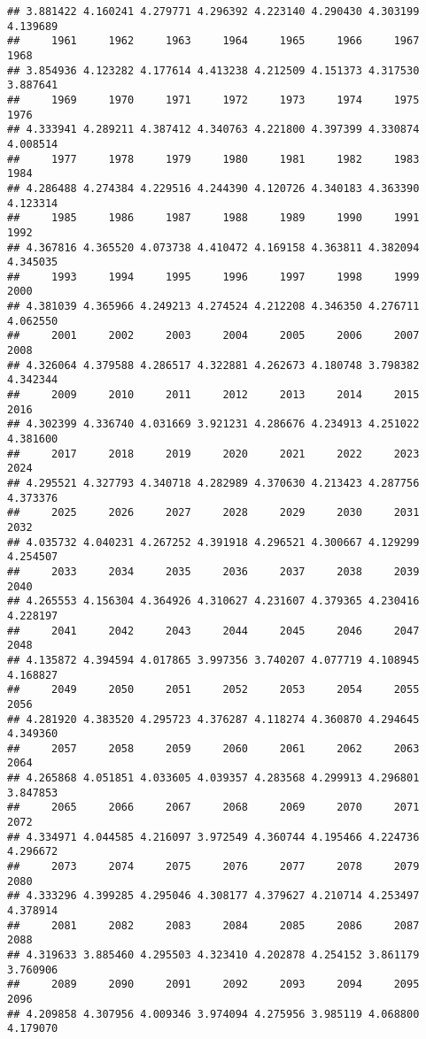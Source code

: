 \documentclass[
]{article}
\begin{document}
\begin{verbatim}
## 3.881422 4.160241 4.279771 4.296392 4.223140 4.290430 4.303199 4.139689 
##     1961     1962     1963     1964     1965     1966     1967     1968 
## 3.854936 4.123282 4.177614 4.413238 4.212509 4.151373 4.317530 3.887641 
##     1969     1970     1971     1972     1973     1974     1975     1976 
## 4.333941 4.289211 4.387412 4.340763 4.221800 4.397399 4.330874 4.008514 
##     1977     1978     1979     1980     1981     1982     1983     1984 
## 4.286488 4.274384 4.229516 4.244390 4.120726 4.340183 4.363390 4.123314 
##     1985     1986     1987     1988     1989     1990     1991     1992 
## 4.367816 4.365520 4.073738 4.410472 4.169158 4.363811 4.382094 4.345035 
##     1993     1994     1995     1996     1997     1998     1999     2000 
## 4.381039 4.365966 4.249213 4.274524 4.212208 4.346350 4.276711 4.062550 
##     2001     2002     2003     2004     2005     2006     2007     2008 
## 4.326064 4.379588 4.286517 4.322881 4.262673 4.180748 3.798382 4.342344 
##     2009     2010     2011     2012     2013     2014     2015     2016 
## 4.302399 4.336740 4.031669 3.921231 4.286676 4.234913 4.251022 4.381600 
##     2017     2018     2019     2020     2021     2022     2023     2024 
## 4.295521 4.327793 4.340718 4.282989 4.370630 4.213423 4.287756 4.373376 
##     2025     2026     2027     2028     2029     2030     2031     2032 
## 4.035732 4.040231 4.267252 4.391918 4.296521 4.300667 4.129299 4.254507 
##     2033     2034     2035     2036     2037     2038     2039     2040 
## 4.265553 4.156304 4.364926 4.310627 4.231607 4.379365 4.230416 4.228197 
##     2041     2042     2043     2044     2045     2046     2047     2048 
## 4.135872 4.394594 4.017865 3.997356 3.740207 4.077719 4.108945 4.168827 
##     2049     2050     2051     2052     2053     2054     2055     2056 
## 4.281920 4.383520 4.295723 4.376287 4.118274 4.360870 4.294645 4.349360 
##     2057     2058     2059     2060     2061     2062     2063     2064 
## 4.265868 4.051851 4.033605 4.039357 4.283568 4.299913 4.296801 3.847853 
##     2065     2066     2067     2068     2069     2070     2071     2072 
## 4.334971 4.044585 4.216097 3.972549 4.360744 4.195466 4.224736 4.296672 
##     2073     2074     2075     2076     2077     2078     2079     2080 
## 4.333296 4.399285 4.295046 4.308177 4.379627 4.210714 4.253497 4.378914 
##     2081     2082     2083     2084     2085     2086     2087     2088 
## 4.319633 3.885460 4.295503 4.323410 4.202878 4.254152 3.861179 3.760906 
##     2089     2090     2091     2092     2093     2094     2095     2096 
## 4.209858 4.307956 4.009346 3.974094 4.275956 3.985119 4.068800 4.179070 

\end{verbatim}
\end{document}
